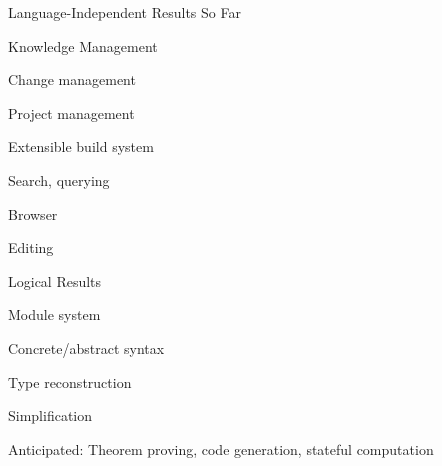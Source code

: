 \documentclass{beamer}
\begin{document}
\begin{myframe}{Language-Independent Results So Far}
\begin{blockitems}{Knowledge Management}
		\item Change management
		\item Project management
		\item Extensible build system
		\item Search, querying
		\item Browser
		\item Editing
\end{blockitems}

\begin{blockitems}{Logical Results}
		\item Module system
		\item Concrete/abstract syntax
		\item Type reconstruction
		\item Simplification
		\item Anticipated: Theorem proving, code generation, stateful computation
\end{blockitems}
\end{myframe}
\end{document}
